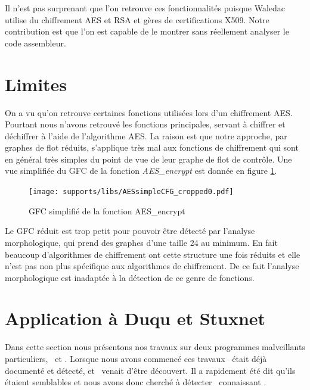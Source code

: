 Il n'est pas surprenant que l'on retrouve ces fonctionnalités puisque Waledac utilise du chiffrement AES et RSA et gères de certifications X509. Notre contribution est que l'on est capable de le montrer sans réellement analyser le code assembleur.

\section{Limites}
On a vu qu'on retrouve certaines fonctions utilisées lors d'un chiffrement AES.
Pourtant nous n'avons retrouvé les fonctions principales, servant à chiffrer et déchiffrer à l'aide de l'algorithme AES.
La raison est que notre approche, par graphes de flot réduits, s'applique très mal aux fonctions de chiffrement qui sont en général très simples du point de vue de leur graphe de flot de contrôle.
Une vue simplifiée du GFC de la fonction \emph{AES\_encrypt} est donnée en figure \ref{fig:AES_encrypt_CFG}.

\begin{figure}[h]
\begin{center}
\texttt{[image: supports/libs/AESsimpleCFG\_cropped0.pdf]}

\end{center}
\caption{GFC simplifié de la fonction AES\_encrypt}
\label{fig:AES_encrypt_CFG}
\end{figure}

Le GFC réduit est trop petit pour pouvoir être détecté par l'analyse morphologique, qui prend des graphes d'une taille 24 au minimum.
En fait beaucoup d'algorithmes de chiffrement ont cette structure une fois réduits et elle n'est pas non plus spécifique aux algorithmes de chiffrement. De ce fait l'analyse morphologique est inadaptée à la détection de ce genre de fonctions.

\section{Application à Duqu et Stuxnet}
Dans cette section nous présentons nos travaux sur deux programmes malveillants particuliers, \duqu\ et \stux.
Lorsque nous avons commencé ces travaux \stux\ était déjà documenté et détecté, et \duqu\ venait d'être découvert.
Il a rapidement été dit qu'ils étaient semblables et nous avons donc cherché à détecter \duqu\ connaissant \stux.

